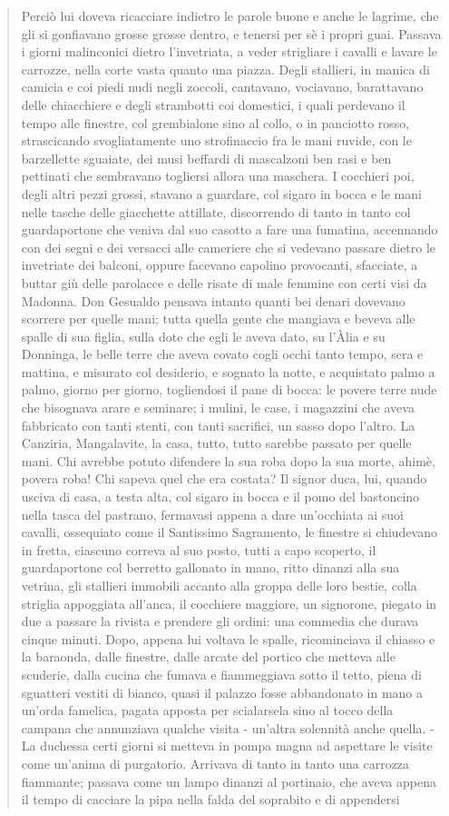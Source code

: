 \documentclass{book}
\begin{document}
\begin{quote}
Perciò lui doveva ricacciare indietro le parole buone e anche le lagrime, che gli si gonfiavano grosse grosse dentro, e tenersi per sè i propri guai. Passava i giorni malinconici dietro l’invetriata, a veder strigliare i cavalli e lavare le carrozze, nella corte vasta quanto una piazza. Degli stallieri, in manica di camicia e coi piedi nudi negli zoccoli, cantavano, vociavano, barattavano delle chiacchiere e degli strambotti coi domestici, i quali perdevano il tempo alle finestre, col grembialone sino al collo, o in panciotto rosso, strascicando svogliatamente uno strofinaccio fra le mani ruvide, con le barzellette sguaiate, dei musi beffardi di mascalzoni ben rasi e ben pettinati che sembravano togliersi allora una maschera. I cocchieri poi, degli altri pezzi grossi, stavano a guardare, col sigaro in bocca e le mani nelle tasche delle giacchette attillate, discorrendo di tanto in tanto col guardaportone che veniva dal suo casotto a fare una fumatina, accennando con dei segni e dei versacci alle cameriere che si vedevano passare dietro le invetriate dei balconi, oppure facevano capolino provocanti, sfacciate, a buttar giù delle parolacce e delle risate di male femmine con certi visi da Madonna. Don Gesualdo pensava intanto quanti bei denari dovevano scorrere per quelle mani; tutta quella gente che mangiava e beveva alle spalle di sua figlia, sulla dote che egli le aveva dato, su l’Àlia e su Donninga, le belle terre che aveva covato cogli occhi tanto tempo, sera e mattina, e misurato col desiderio, e sognato la notte, e acquistato palmo a palmo, giorno per giorno, togliendosi il pane di bocca: le povere terre nude che bisognava arare e seminare; i mulini, le case, i magazzini che aveva fabbricato con tanti stenti, con tanti sacrifici, un sasso dopo l’altro. La Canziria, Mangalavite, la casa, tutto, tutto sarebbe passato per quelle mani. Chi avrebbe potuto difendere la sua roba dopo la sua morte, ahimè, povera roba! Chi sapeva quel che era costata? Il signor duca, lui, quando usciva di casa, a testa alta, col sigaro in bocca e il pomo del bastoncino nella tasca del pastrano, fermavasi appena a dare un’occhiata ai suoi cavalli, ossequiato come il Santissimo Sagramento, le finestre si chiudevano in fretta, ciascuno correva al suo posto, tutti a capo scoperto, il guardaportone col berretto gallonato in mano, ritto dinanzi alla sua vetrina, gli stallieri immobili accanto alla groppa delle loro bestie, colla striglia appoggiata all’anca, il cocchiere maggiore, un signorone, piegato in due a passare la rivista e prendere gli ordini: una commedia che durava cinque minuti. Dopo, appena lui voltava le spalle, ricominciava il chiasso e la baraonda, dalle finestre, dalle arcate del portico che metteva alle scuderie, dalla cucina che fumava e fiammeggiava sotto il tetto, piena di sguatteri vestiti di bianco, quasi il palazzo fosse abbandonato in mano a un’orda famelica, pagata apposta per scialarsela sino al tocco della campana che annunziava qualche visita - un’altra solennità anche quella. - La duchessa certi giorni si metteva in pompa magna ad aspettare le visite come un’anima di purgatorio. Arrivava di tanto in tanto una carrozza fiammante; passava come un lampo dinanzi al portinaio, che aveva appena il tempo di cacciare la pipa nella falda del soprabito e di appendersi 
\end{quote}
\end{document}
